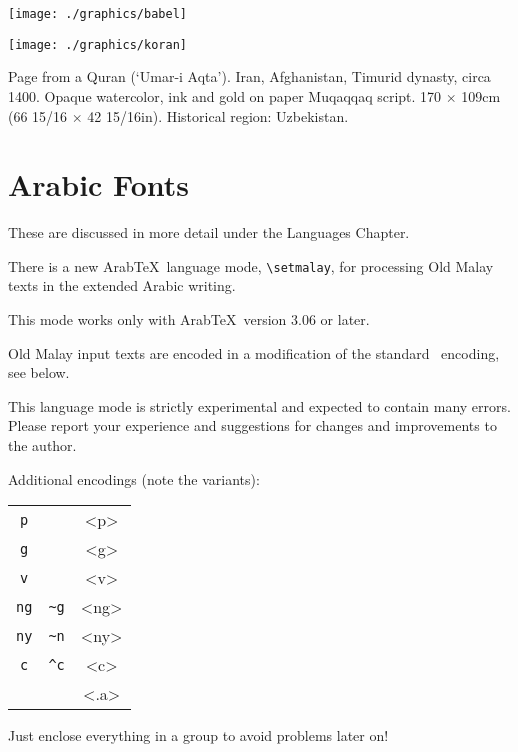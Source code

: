 \clearpage

\texttt{[image: ./graphics/babel]}\par


\begin{multicols}{2}
\texttt{[image: ./graphics/koran]}

{Page from a Quran (`Umar-i Aqta'). Iran, Afghanistan, Timurid dynasty, circa 1400. Opaque watercolor, ink and gold on paper Muqaqqaq script. 170 $\times$ 109cm (66 15/16 $\times$ 42 15/16in). Historical region: Uzbekistan.}

\columnbreak

\section*{Arabic Fonts}
These are discussed in more detail under the Languages Chapter. 

\bgroup
\setmalay
There is a new Arab\TeX\ language mode, \verb+\setmalay+,
for processing Old Malay texts in the extended Arabic writing.

This mode works only with Arab\TeX\ version 3.06 or later.

Old Malay input texts are encoded in a modification of the
standard \ArabTeX\ encoding, see below.

This language mode is strictly experimental
and expected to contain many errors.
Please report your experience and suggestions 
for changes and improvements to the author.

Additional encodings (note the variants):

\begin{center}
\Large
\begin{tabular}{|cc|c|}
\hline
\verb+p+	&		&<p> \\
\verb+g+	&		&<g> \\
\verb+v+	& 		&<v> \\
\verb+ng+	&\verb+~g+	&<ng>\\
\verb+ny+	&\verb+~n+	&<ny>\\
\verb+c+	&\verb+^c+	&<c> \\
          & & <.a>\\
\hline
\end{tabular}
\end{center}
\egroup

Just enclose everything in a group to avoid problems later on!
\end{multicols}

